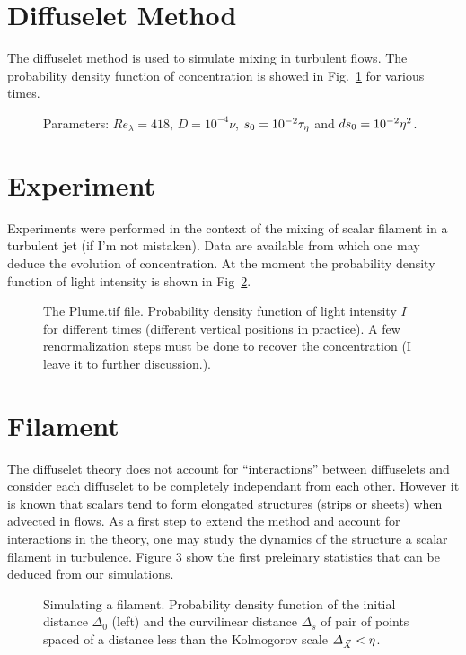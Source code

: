 \section{Diffuselet Method}

The diffuselet method is used to simulate mixing in turbulent flows.
The probability density function of concentration is showed in Fig.~\ref{fig:diffuselet_concentration} for various times.
\begin{figure}
    \centering
    
    \caption{
    	Parameters: $\mathit{Re}_\lambda = 418$, $D = 10^{-4} \nu$, $s_0 = 10^{-2} \tau_{\eta}$ and $ds_0 = 10^{-2} \eta^2$.
    }
    \label{fig:diffuselet_concentration}
\end{figure}

\section{Experiment}

Experiments were performed in the context of the mixing of scalar filament in a turbulent jet (if I'm not mistaken).
Data are available from which one may deduce the evolution of concentration.
At the moment the probability density function of light intensity is shown in Fig~\ref{fig:exp_intensity}.
\begin{figure}
    \centering
    
    \caption{
		The Plume.tif file. Probability density function of light intensity $I$ for different times (different vertical positions in practice).
		A few renormalization steps must be done to recover the concentration (I leave it to further discussion.).
    }
    \label{fig:exp_intensity}
\end{figure}

\section{Filament}

The diffuselet theory does not account for ``interactions'' between diffuselets and consider each diffuselet to be completely independant from each other.
However it is known that scalars tend to form elongated structures (strips or sheets) when advected in flows.
As a first step to extend the method and account for interactions in the theory, one may study the dynamics of the structure a scalar filament in turbulence.
Figure \ref{fig:filament_stats} show the first preleinary statistics that can be deduced from our simulations.
\begin{figure}
    \centering
    
    \caption{
		Simulating a filament. Probability density function of the initial distance $\varDelta_0$ (left) and the curvilinear distance $\varDelta_s$ of pair of points spaced of a distance less than the Kolmogorov scale $\varDelta_{\vec{X}} < \eta$.
    }
    \label{fig:filament_stats}
\end{figure}
